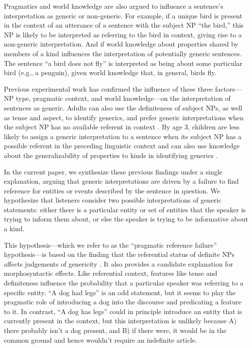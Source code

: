 \documentclass[10pt,letterpaper]{article}
\begin{document}
Pragmatics and world knowledge are also argued to influence a sentence's interpretation as generic or non-generic. For example, if a unique bird is present in the context of an utterance of a sentence with the subject NP ``the bird,'' this NP is likely to be interpreted as referring to the bird in context, giving rise to a non-generic interpretation. And if world knowledge about properties shared by members of a kind influences the interpretation of potentially generic sentences. The sentence ``a bird does not fly'' is interpreted as being about some particular bird (e.g., a penguin), given world knowledge that, in general, birds fly.

Previous experimental work has confirmed the influence of these three factors---NP type, pragmatic context, and world knowledge---on the interpretation of sentences as generic. Adults can also use the definiteness of subject NPs, as well as tense and aspect, to identify generics, and prefer generic interpretations when the subject NP has no available referent in context \cite{Gelman:2003,Cimpian:2011}. By age 3, children are less likely to assign a generic interpretation to a sentence when its subject NP has a possible referent in the preceding linguistic context and can also use knowledge about the generalizability of properties to kinds in identifying generics \cite{Cimpian:2008}.


In the current paper, we synthesize these previous findings under a single explanation, arguing that generic interpretations are driven by a failure to find reference for entities or events described by the sentence in question. We hypothesize that listeners consider two possible interpretations of generic statements: either there is a particular entity or set of entities that the speaker is trying to inform them about, or else the speaker is trying to be informative about a kind.

This hypothesis---which we refer to as the ``pragmatic reference failure'' hypothesis---is based on the finding that the referential status of definite NPs affects judgements of genericity \cite{Gelman:2003}. It also provides a candidate explanation for morphosyntactic effects. Like referential context, features like tense and definiteness influence the probability that a particular speaker was referring to a specific entity. ``A dog had legs'' is an odd statement, but it seems to play the pragmatic role of introducing a dog into the discourse and predicating a feature to it. In contrast, ``A dog has legs'' could in principle introduce an entity that is currently present in the context, but this interpretation is unlikely because A) there probably isn't a dog present, and B) if there were, it would be in the common ground and hence wouldn't require an indefinite article.
\end{document}
